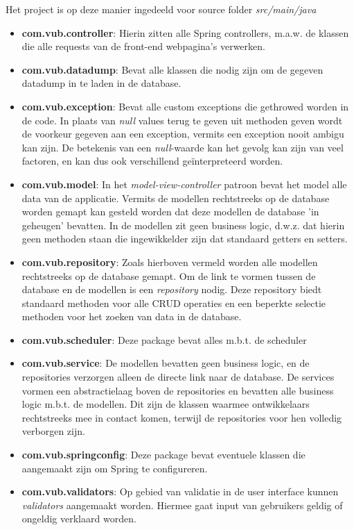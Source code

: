 \noindent
Het project is op deze manier ingedeeld voor source folder \emph{src/main/java}
\begin{itemize}
	\item \textbf{com.vub.controller}: Hierin zitten alle Spring controllers, m.a.w. de klassen die alle requests van de front-end webpagina's verwerken.
	\item \textbf{com.vub.datadump}: Bevat alle klassen die nodig zijn om de gegeven datadump in te laden in de database.
	\item \textbf{com.vub.exception}: Bevat alle custom exceptions die gethrowed worden in de code. 
	In plaats van \emph{null} values terug te geven uit methoden geven wordt de voorkeur gegeven aan een exception, vermits een exception nooit ambigu kan zijn. De betekenis van een \emph{null}-waarde kan het gevolg kan zijn van veel factoren, en kan dus ook verschillend ge\"{i}nterpreteerd worden.
	\item \textbf{com.vub.model}: In het \emph{model-view-controller} patroon bevat het model alle data van de applicatie.
	Vermits de modellen rechtstreeks op de database worden gemapt kan gesteld worden dat deze modellen de database 'in geheugen' bevatten. 
	In de modellen zit geen business logic, d.w.z. dat hierin geen methoden staan die ingewikkelder zijn dat standaard getters en setters. 
	\item \textbf{com.vub.repository}: Zoals hierboven vermeld worden alle modellen rechtstreeks op de database gemapt.
	Om de link te vormen tussen de database en de modellen is een \emph{repository} nodig.
	Deze repository biedt standaard methoden voor alle CRUD operaties en een beperkte selectie methoden voor het zoeken van data in de database.
	\item \textbf{com.vub.scheduler}: Deze package bevat alles m.b.t. de scheduler
	\item \textbf{com.vub.service}: De modellen bevatten geen business logic, en de repositories verzorgen alleen de directe link naar de database. 
	De services vormen een abstractielaag boven de repositories en bevatten alle business logic m.b.t. de modellen.
	Dit zijn de klassen waarmee ontwikkelaars rechtstreeks mee in contact komen, terwijl de repositories voor hen volledig verborgen zijn.
	\item \textbf{com.vub.springconfig}: Deze package bevat eventuele klassen die aangemaakt zijn om Spring te configureren. 
	\item \textbf{com.vub.validators}: Op gebied van validatie in de user interface kunnen \emph{validators} aangemaakt worden. 
	Hiermee gaat input van gebruikers geldig of ongeldig verklaard worden. 
\end{itemize}
	
